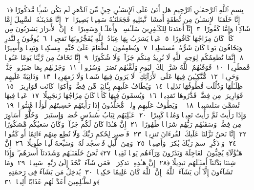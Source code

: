 
  
    
  
    
    

\nopagebreak
  بِسمِ ٱللَّهِ ٱلرَّحمَـٰنِ ٱلرَّحِيمِ
  هَل أَتَىٰ عَلَى ٱلإِنسَـٰنِ حِينٌۭ مِّنَ ٱلدَّهرِ لَم يَكُن شَيـًۭٔا مَّذكُورًا ﴿١﴾
 إِنَّا خَلَقنَا ٱلإِنسَـٰنَ مِن نُّطفَةٍ أَمشَاجٍۢ نَّبتَلِيهِ فَجَعَلنَـٰهُ سَمِيعًۢا بَصِيرًا ﴿٢﴾
 إِنَّا هَدَينَـٰهُ ٱلسَّبِيلَ إِمَّا شَاكِرًۭا وَإِمَّا كَفُورًا ﴿٣﴾
 إِنَّآ أَعتَدنَا لِلكَـٰفِرِينَ سَلَـٰسِلَا۟ وَأَغلَـٰلًۭا وَسَعِيرًا ﴿٤﴾
 إِنَّ ٱلأَبرَارَ يَشرَبُونَ مِن كَأسٍۢ كَانَ مِزَاجُهَا كَافُورًا ﴿٥﴾
 عَينًۭا يَشرَبُ بِهَا عِبَادُ ٱللَّهِ يُفَجِّرُونَهَا تَفجِيرًۭا ﴿٦﴾
 يُوفُونَ بِٱلنَّذرِ وَيَخَافُونَ يَومًۭا كَانَ شَرُّهُۥ مُستَطِيرًۭا ﴿٧﴾
 وَيُطعِمُونَ ٱلطَّعَامَ عَلَىٰ حُبِّهِۦ مِسكِينًۭا وَيَتِيمًۭا وَأَسِيرًا ﴿٨﴾
 إِنَّمَا نُطعِمُكُم لِوَجهِ ٱللَّهِ لَا نُرِيدُ مِنكُم جَزَآءًۭ وَلَا شُكُورًا ﴿٩﴾
 إِنَّا نَخَافُ مِن رَّبِّنَا يَومًا عَبُوسًۭا قَمطَرِيرًۭا ﴿١٠﴾
 فَوَقَىٰهُمُ ٱللَّهُ شَرَّ ذَٟلِكَ ٱليَومِ وَلَقَّىٰهُم نَضرَةًۭ وَسُرُورًۭا ﴿١١﴾
 وَجَزَىٰهُم بِمَا صَبَرُوا۟ جَنَّةًۭ وَحَرِيرًۭا ﴿١٢﴾
 مُّتَّكِـِٔينَ فِيهَا عَلَى ٱلأَرَآئِكِ ۖ لَا يَرَونَ فِيهَا شَمسًۭا وَلَا زَمهَرِيرًۭا ﴿١٣﴾
 وَدَانِيَةً عَلَيهِم ظِلَـٰلُهَا وَذُلِّلَت قُطُوفُهَا تَذلِيلًۭا ﴿١٤﴾
 وَيُطَافُ عَلَيهِم بِـَٔانِيَةٍۢ مِّن فِضَّةٍۢ وَأَكوَابٍۢ كَانَت قَوَارِيرَا۠ ﴿١٥﴾
 قَوَارِيرَا۟ مِن فِضَّةٍۢ قَدَّرُوهَا تَقدِيرًۭا ﴿١٦﴾
 وَيُسقَونَ فِيهَا كَأسًۭا كَانَ مِزَاجُهَا زَنجَبِيلًا ﴿١٧﴾
 عَينًۭا فِيهَا تُسَمَّىٰ سَلسَبِيلًۭا ﴿١٨﴾
 ۞ وَيَطُوفُ عَلَيهِم وِلدَٟنٌۭ مُّخَلَّدُونَ إِذَا رَأَيتَهُم حَسِبتَهُم لُؤلُؤًۭا مَّنثُورًۭا ﴿١٩﴾
 وَإِذَا رَأَيتَ ثَمَّ رَأَيتَ نَعِيمًۭا وَمُلكًۭا كَبِيرًا ﴿٢٠﴾
 عَـٰلِيَهُم ثِيَابُ سُندُسٍ خُضرٌۭ وَإِستَبرَقٌۭ ۖ وَحُلُّوٓا۟ أَسَاوِرَ مِن فِضَّةٍۢ وَسَقَىٰهُم رَبُّهُم شَرَابًۭا طَهُورًا ﴿٢١﴾
 إِنَّ هَـٰذَا كَانَ لَكُم جَزَآءًۭ وَكَانَ سَعيُكُم مَّشكُورًا ﴿٢٢﴾
 إِنَّا نَحنُ نَزَّلنَا عَلَيكَ ٱلقُرءَانَ تَنزِيلًۭا ﴿٢٣﴾
 فَٱصبِر لِحُكمِ رَبِّكَ وَلَا تُطِع مِنهُم ءَاثِمًا أَو كَفُورًۭا ﴿٢٤﴾
 وَٱذكُرِ ٱسمَ رَبِّكَ بُكرَةًۭ وَأَصِيلًۭا ﴿٢٥﴾
 وَمِنَ ٱلَّيلِ فَٱسجُد لَهُۥ وَسَبِّحهُ لَيلًۭا طَوِيلًا ﴿٢٦﴾
 إِنَّ هَـٰٓؤُلَآءِ يُحِبُّونَ ٱلعَاجِلَةَ وَيَذَرُونَ وَرَآءَهُم يَومًۭا ثَقِيلًۭا ﴿٢٧﴾
 نَّحنُ خَلَقنَـٰهُم وَشَدَدنَآ أَسرَهُم ۖ وَإِذَا شِئنَا بَدَّلنَآ أَمثَـٰلَهُم تَبدِيلًا ﴿٢٨﴾
 إِنَّ هَـٰذِهِۦ تَذكِرَةٌۭ ۖ فَمَن شَآءَ ٱتَّخَذَ إِلَىٰ رَبِّهِۦ سَبِيلًۭا ﴿٢٩﴾
 وَمَا تَشَآءُونَ إِلَّآ أَن يَشَآءَ ٱللَّهُ ۚ إِنَّ ٱللَّهَ كَانَ عَلِيمًا حَكِيمًۭا ﴿٣٠﴾
 يُدخِلُ مَن يَشَآءُ فِى رَحمَتِهِۦ ۚ وَٱلظَّـٰلِمِينَ أَعَدَّ لَهُم عَذَابًا أَلِيمًۢا ﴿٣١﴾
 
